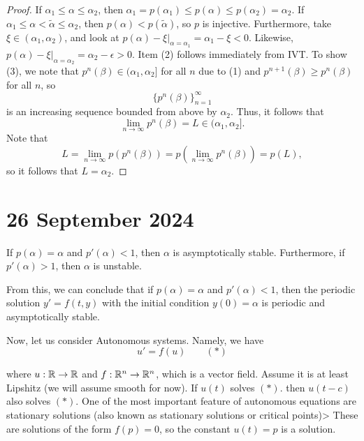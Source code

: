 \documentclass{article}
\begin{document}
    \begin{proof}
        If $\alpha_1 \leq \alpha \leq \alpha_2$, then $\alpha_1 = p(\alpha_1) \leq p(\alpha) \leq p(\alpha_2) = \alpha_2$. If $\alpha_1 \leq \alpha < \tilde \alpha \leq \alpha_2$, then $p(\alpha) < p(\tilde \alpha)$, so $p$ is injective. Furthermore, take $\xi \in (\alpha_1, \alpha_2)$, and look at $p(\alpha) - \xi \big|_{\alpha = \alpha_1} = \alpha_1 - \xi < 0$. Likewise, $p(\alpha) - \xi \big|_{\alpha = \alpha_2} = \alpha_2 - \epsilon > 0$. Item (2) follows immediately from IVT. To show (3), we note that $p^n(\beta) \in (\alpha_1, \alpha_2]$ for all $n$ due to (1) and $p^{n + 1}(\beta) \geq p^n (\beta)$ for all $n$, so 
        \[
            \{p^n(\beta)\}_{n = 1}^\infty
        \]
        is an increasing sequence bounded from above by $\alpha_2$. Thus, it follows that 
        \[
            \lim_{n \to \infty} p^n(\beta) = L \in (\alpha_1, \alpha_2].
        \]
        Note that 
        \[
            L = \lim_{n \to \infty} p(p^n(\beta)) = p(\lim_{n \to \infty} p^n (\beta)) = p(L),
        \]
        so it follows that $L = \alpha_2$. 
    \end{proof}

\section*{26 September 2024}
    \begin{theorem}[Claim.]{}
        If $p(\alpha) = \alpha$ and $p'(\alpha) < 1$, then $\alpha$ is asymptotically stable. Furthermore, if $p'(\alpha) > 1$, then $\alpha$ is unstable. 
    \end{theorem}

    From this, we can conclude that if $p(\alpha) = \alpha$ and $p'(\alpha) < 1$, then the periodic solution $y' = f(t, y)$ with the initial condition $y(0) = \alpha$ is periodic and asymptotically stable. 
    \newpar

    Now, let us consider Autonomous systems. Namely, we have 
    \[
        u' = f(u) \qquad(*)
    \] 

    where $u : \mathbb{R} \to \mathbb{R}$ and $f : \mathbb{R}^n \to \mathbb{R}^n$, which is a vector field. Assume it is at least Lipshitz (we will assume smooth for now). If $u(t)$ solves $(*)$. then $u(t - c)$ also solves $(*)$. One of the most important feature of autonomous equations are stationary solutions (also known as stationary solutions or critical points)> These are solutions of the form $f(p) = 0$, so the constant $u(t) = p$ is a solution. 
    \newpar
\end{document}
